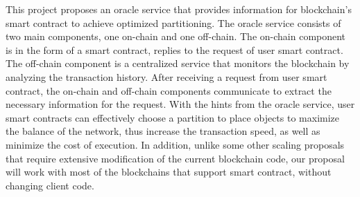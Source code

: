 This project proposes an oracle service that provides information for
blockchain's smart contract to achieve optimized partitioning. The oracle service
consists of two main components, one on-chain and one off-chain.
The on-chain component is in the form of a smart contract, replies to the request of
user smart contract. The off-chain component is a centralized  service that monitors the blockchain by analyzing the transaction
history. After receiving a request from user smart contract, the on-chain and
off-chain components communicate to extract the necessary information for the
request. With the hints from the oracle service, user smart contracts can
effectively choose a partition to place objects to maximize the balance of the
network, thus increase the transaction speed, as well as minimize the cost of
execution. In addition, unlike some other scaling proposals that require
extensive modification of the current blockchain code, our proposal will work
with most of the blockchains that support smart contract, without changing client
code.
